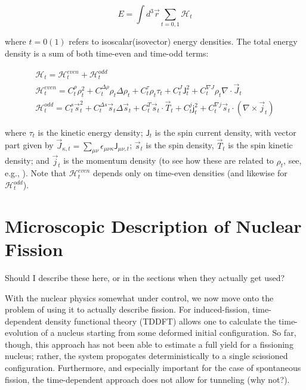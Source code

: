 \begin{equation}
E = \int d^3\vec{r}\sum_{t=0,1}\mathcal{H}_t
\end{equation}

\noindent where $t=0(1)$ refers to isoscalar(isovector) energy densities. The total energy density is a sum of both time-even and time-odd terms:

\begin{eqnarray}
\mathcal{H}_t = \mathcal{H}^{even}_t + \mathcal{H}^{odd}_t \\
\mathcal{H}^{even}_t = C^\rho_t\rho_t^2 + C_t^{\Delta\rho}\rho_t\Delta\rho_t + C^\tau_t\rho_t\tau_t + C^J_t\mathsf{J}^2_t + C^{\nabla J}_t\rho_t\nabla\cdot\vec{J}_t \\
\mathcal{H}^{odd}_t = C^s_t \vec{s}_t^2 + C_t^{\Delta s}\vec{s}_t\Delta\vec{s}_t + C^T_t\vec{s}_t\cdot\vec{T}_t + C^j_t\mathsf{j}^2_t + C^{\nabla j}_t\vec{s}_t\cdot(\nabla\times\vec{j}_t)
\end{eqnarray}

\noindent where $\tau_t$ is the kinetic energy density; $\mathsf{J}_t$ is the spin current density, with vector part given by $\vec{J}_{\kappa,t} = \sum_{\mu\nu}\epsilon_{\mu\nu\kappa}\mathsf{J}_{\mu\nu,t}$; $\vec{s}_t$ is the spin density, $\vec{T}_t$ is the spin kinetic density; and $\vec{j}_t$ is the momentum density (to see how these are related to $\rho_t$, see, e.g., \cite{Bender2003}). Note that $\mathcal{H}^{even}_t$ depends only on time-even densities (and likewise for $\mathcal{H}^{odd}_t$).

\section{Microscopic Description of Nuclear Fission}
Should I describe these here, or in the sections when they actually get used?

With the nuclear physics somewhat under control, we now move onto the problem of using it to actually describe fission. For induced-fission, time-dependent density functional theory (TDDFT) allows one to calculate the time-evolution of a nucleus starting from some deformed initial configuration. So far, though, this approach has not been able to estimate a full yield for a fissioning nucleus; rather, the system propogates deterministically to a single scissioned configuration. Furthermore, and especially important for the case of spontaneous fission, the time-dependent approach does not allow for tunneling (why not?).

